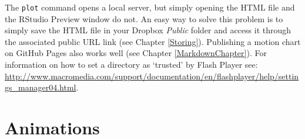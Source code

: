 The \verb|plot| command opens a local server, but simply opening the HTML file and the RStudio Preview window do not. An easy way to solve this problem is to simply save the HTML file in your Dropbox \emph{Public} folder and access it through the associated public URL link (see Chapter \ref{Storing}). Publishing a motion chart on GitHub Pages also works well (see Chapter \ref{MarkdownChapter}). For information on how to set a directory as `trusted' by Flash Player see: \url{http://www.macromedia.com/support/documentation/en/flashplayer/help/settings_manager04.html}.

\section{Animations}


